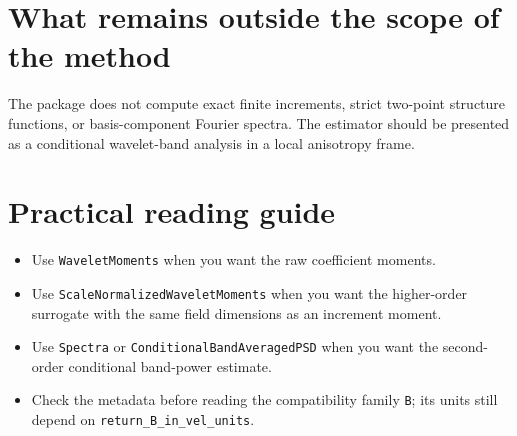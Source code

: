 \documentclass[11pt]{article}
\begin{document}
\section*{What remains outside the scope of the method}

The package does not compute exact finite increments, strict two-point structure
functions, or basis-component Fourier spectra. The estimator should be presented as a
conditional wavelet-band analysis in a local anisotropy frame.

\section*{Practical reading guide}

\begin{itemize}[leftmargin=1.6em,itemsep=0.35em]
\item Use \texttt{WaveletMoments} when you want the raw coefficient moments.
\item Use \texttt{ScaleNormalizedWaveletMoments} when you want the higher-order
surrogate with the same field dimensions as an increment moment.
\item Use \texttt{Spectra} or \texttt{ConditionalBandAveragedPSD} when you want the
second-order conditional band-power estimate.
\item Check the metadata before reading the compatibility family \texttt{B}; its units
still depend on \texttt{return\_B\_in\_vel\_units}.
\end{itemize}
\end{document}

